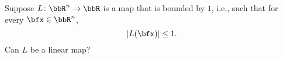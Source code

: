 \begin{questions}
  \question

  \question Suppose $L\colon\bbR^n\to\bbR$ is a map that is bounded by $1$,
  i.e., such that for every $\bfx\in\bbR^n$,
  \[
    |L(\bfx)|\leq 1.
  \]
  Can $L$ be a linear map?
\end{questions}

